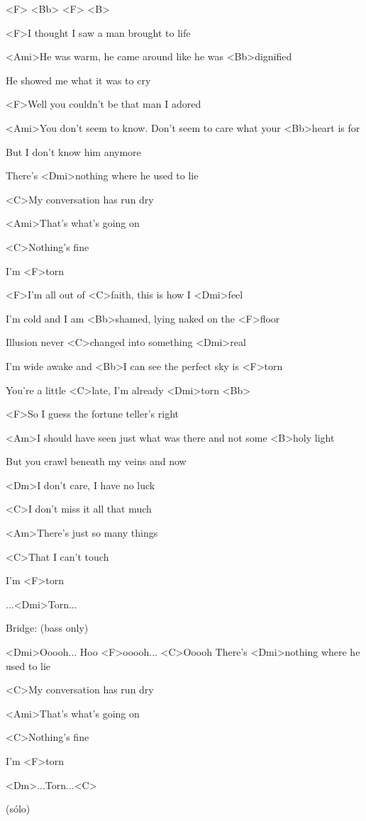 
<F> <Bb> <F> <B>

\zs
<F>I thought I saw a man brought to life

<Ami>He was warm, he came around like he was <Bb>dignified

He showed me what it was to cry

<F>Well you couldn't be that man I adored 

<Ami>You don't seem to know. Don't seem to care what your <Bb>heart is for

But I don't know him anymore 

There's <Dmi>nothing where he used to lie

<C>My conversation has run dry

<Ami>That's what's going on

<C>Nothing's fine

I'm <F>torn
\ks

\zr
<F>I'm all out of <C>faith, this is how I <Dmi>feel

I'm cold and I am <Bb>shamed, lying naked on the <F>floor

Illusion never <C>changed into something <Dmi>real

I'm wide awake and <Bb>I can see the perfect sky is <F>torn

You're a little <C>late, I'm already <Dmi>torn <Bb>
\kr

\zs
<F>So I guess the fortune teller's right

<Am>I should have seen just what was there and not some <B>holy light

But you crawl beneath my veins and now

<Dm>I don't care, I have no luck

<C>I don't miss it all that much 

<Am>There's just so many things

<C>That I can't touch

I'm <F>torn
\ks

\zr
\kr
...<Dmi>Torn...

Bridge: (bass only)

<Dmi>Ooooh... Hoo <F>ooooh... <C>Ooooh
\zs
There's <Dmi>nothing where he used to lie

<C>My conversation has run dry

<Ami>That's what's going on

<C>Nothing's fine

I'm <F>torn
\ks

\zr
\kr
<Dm>...Torn...<C>

\zr
(sólo)
\kr

\kp
